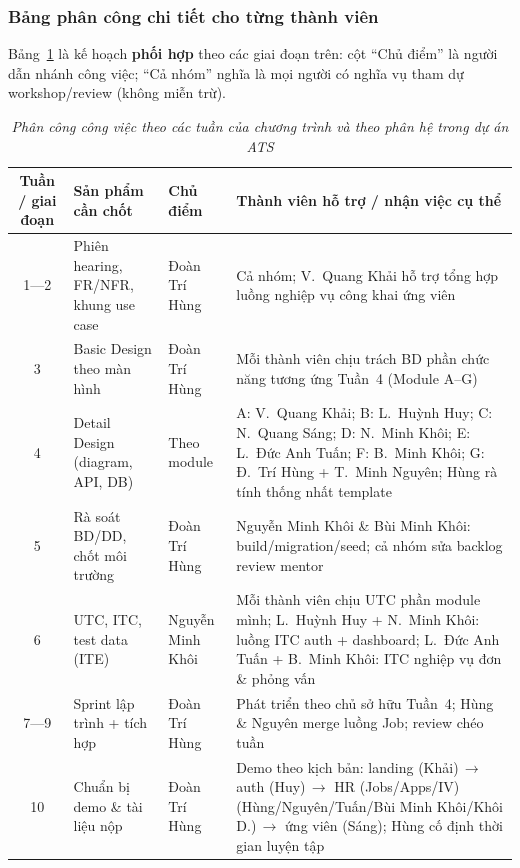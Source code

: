 \subsubsection*{Bảng phân công chi tiết cho từng thành viên}
Bảng~\ref{tab:phan-cong-nhom} là kế hoạch \textbf{phối hợp} theo các giai đoạn trên: cột ``Chủ điểm'' là người dẫn nhánh công việc; ``Cả nhóm'' nghĩa là mọi người có nghĩa vụ tham dự workshop/review (không miễn trừ).

\begin{table}[H]
    \centering
    \footnotesize
    \setlength{\tabcolsep}{3pt}
    \renewcommand{\arraystretch}{1.25}
    \begin{tabular}{|c|p{4.3cm}|p{3.75cm}|p{3.9cm}|}
        \hline
        \textbf{Tuần / giai đoạn} & \textbf{Sản phẩm cần chốt} & \textbf{Chủ điểm} & \textbf{Thành viên hỗ trợ / nhận việc cụ thể} \\
        \hline
        1---2 & Phiên hearing, FR/NFR, khung use case & Đoàn Trí Hùng & Cả nhóm; V.~Quang Khải hỗ trợ tổng hợp luồng nghiệp vụ công khai ứng viên \\
        \hline
        3 & Basic Design theo màn hình & Đoàn Trí Hùng & Mỗi thành viên chịu trách BD phần chức năng tương ứng Tuần~4 (Module A--G) \\
        \hline
        4 & Detail Design (diagram, API, DB) & Theo module & A: V.~Quang Khải; B: L.~Huỳnh Huy; C: N.~Quang Sáng; D: N.~Minh Khôi; E: L.~Đức Anh Tuấn; F: B.~Minh Khôi; G: Đ.~Trí Hùng + T.~Minh Nguyên; Hùng rà tính thống nhất template \\
        \hline
        5 & Rà soát BD/DD, chốt môi trường & Đoàn Trí Hùng & Nguyễn Minh Khôi \& Bùi Minh Khôi: build/migration/seed; cả nhóm sửa backlog review mentor \\
        \hline
        6 & UTC, ITC, test data (ITE) & Nguyễn Minh Khôi & Mỗi thành viên chịu UTC phần module mình; L.~Huỳnh Huy + N.~Minh Khôi: luồng ITC auth + dashboard; L.~Đức Anh Tuấn + B.~Minh Khôi: ITC nghiệp vụ đơn \& phỏng vấn \\
        \hline
        7---9 & Sprint lập trình + tích hợp & Đoàn Trí Hùng & Phát triển theo chủ sở hữu Tuần~4; Hùng \& Nguyên merge luồng Job; review chéo tuần \\
        \hline
        10 & Chuẩn bị demo \& tài liệu nộp & Đoàn Trí Hùng & Demo theo kịch bản: landing (Khải)\,\(\rightarrow\) auth (Huy)\,\(\rightarrow\) HR (Jobs/Apps/IV) (Hùng/Nguyên/Tuấn/Bùi Minh Khôi/Khôi D.)\,\(\rightarrow\) ứng viên (Sáng); Hùng cố định thời gian luyện tập \\
        \hline
    \end{tabular}
    \caption{\textit{Phân công công việc theo các tuần của chương trình và theo phân hệ trong dự án ATS}}
    \label{tab:phan-cong-nhom}
\end{table}

